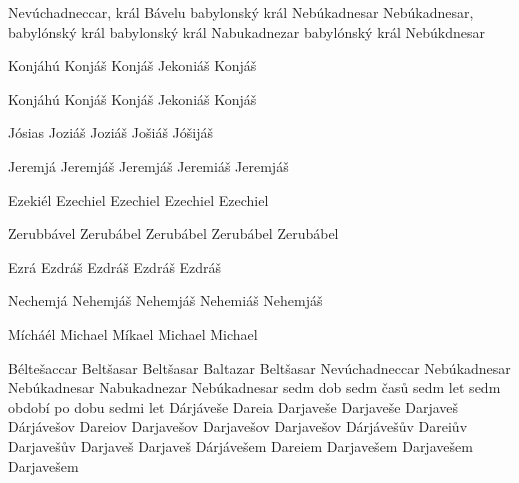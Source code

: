        {Nevúchadneccar, král Bávelu}
       {babylonský král Nebúkadnesar}
       {Nebúkadnesar, babylónský král}
       {babylonský král Nabukadnezar}                  
       {babylónský král Nebúkdnesar}                        
  


        {Konjáhú} %
        {Konjáš} %
        {Konjáš} %
        {Jekoniáš} %
        {Konjáš} %

        {Konjáhú} %
        {Konjáš} %
        {Konjáš} %
        {Jekoniáš} %
        {Konjáš} %

 
 
 
 
        {Jósias}  %
        {Joziáš}  %
        {Joziáš}  %
        {Jošiáš}  %
        {Jóšijáš}  %


 
        {Jeremjá} %
        {Jeremjáš} %
        {Jeremjáš} %
        {Jeremiáš} %
        {Jeremjáš} %
  
 
 
       {Ezekiél} %
       {Ezechiel} %
       {Ezechiel} %
       {Ezechiel} %
       {Ezechiel} %
  



       {Zerubbável} %
       {Zerubábel} %
       {Zerubábel} %
       {Zerubábel} %
       {Zerubábel} %
  

       {Ezrá} %
       {Ezdráš} %
       {Ezdráš} %
       {Ezdráš} %
       {Ezdráš} %
         

       {Nechemjá} %
       {Nehemjáš} %
       {Nehemjáš} %
       {Nehemiáš} %
       {Nehemjáš} %
         

       {Mícháél} %
       {Michael} %
       {Míkael} %
       {Michael} %
       {Michael} %
         





   {Béltešaccar}  {Beltšasar}    {Beltšasar}    {Baltazar} {Beltšasar}   
 {Nevúchadneccar}  {Nebúkadnesar} {Nebúkadnesar} {Nabukadnezar} {Nebúkadnesar}   
 {sedm dob} {sedm časů} {sedm let} {sedm období} {po dobu sedmi let}  
   {Dárjáveše}  {Dareia}  {Darjaveše}  {Darjaveše}  {Darjaveš}   
  {Dárjávešov} {Dareiov} {Darjavešov} {Darjavešov} {Darjavešov}   
 {Dárjávešův} {Dareiův} {Darjavešův} {Darjaveš} {Darjaveš}   
 {Dárjávešem} {Dareiem} {Darjavešem} {Darjavešem} {Darjavešem}   

